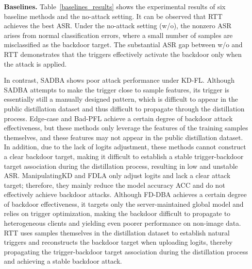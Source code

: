 \documentclass[lettersize,journal]{IEEEtran}
\newif\ifhighlight
\newcommand{\hlone}[1]{%
    \ifhighlight{\color{reviewer1}#1}\else#1\fi
}
\begin{document}
\textbf{Baselines.}
Table~\ref{baselines_results} shows the experimental results of six baseline methods and the no-attack setting. 
It can be observed that RTT achieves the best ASR. 
\hlone{Under the no-attack setting (w/o), the nonzero ASR arises from normal classification errors, where a small number of samples are misclassified as the backdoor target. 
The substantial ASR gap between w/o and RTT demonstrates that the triggers effectively activate the backdoor only when the attack is applied.}
In contrast, SADBA shows poor attack performance under KD-FL. 
Although SADBA attempts to make the trigger close to sample features, its trigger is essentially still a manually designed pattern, which is difficult to appear in the public distillation dataset and thus difficult to propagate through the distillation process. 
Edge-case and Bad-PFL achieve a certain degree of backdoor attack effectiveness, but these methods only leverage the features of the training samples themselves, and these features may not appear in the public distillation dataset. 
In addition, due to the lack of logits adjustment, these methods cannot construct a clear backdoor target, making it difficult to establish a stable trigger-backdoor target association during the distillation process, resulting in low and unstable ASR. 
ManipulatingKD and FDLA only adjust logits and lack a clear attack target; therefore, they mainly reduce the model accuracy ACC and do not effectively achieve backdoor attacks. 
Although FD-DBA achieves a certain degree of backdoor effectiveness, it targets only the server-maintained global model and relies on trigger optimization, making the backdoor difficult to propagate to heterogeneous clients and yielding even poorer performance on non-image data.
RTT uses samples themselves in the distillation dataset to establish natural triggers and reconstructs the backdoor target when uploading logits, thereby propagating the trigger-backdoor target association during the distillation process and achieving a stable backdoor attack.
\end{document}
